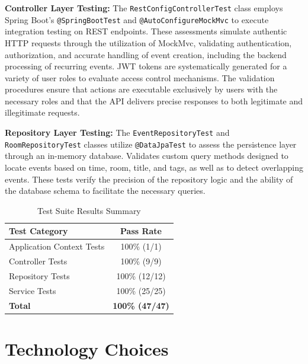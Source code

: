 \textbf{Controller Layer Testing:} The \texttt{RestConfigControllerTest} class employs Spring Boot's \texttt{@SpringBootTest} and \texttt{@AutoConfigureMockMvc} to execute integration testing on REST endpoints.
These assessments simulate authentic HTTP requests through the utilization of MockMvc, validating authentication, authorization, and accurate handling of event creation, including the backend processing of recurring events.
JWT tokens are systematically generated for a variety of user roles to evaluate access control mechanisms.
The validation procedures ensure that actions are executable exclusively by users with the necessary roles and that the API delivers precise responses to both legitimate and illegitimate requests.

\textbf{Repository Layer Testing:} The \texttt{EventRepositoryTest} and \texttt{RoomRepositoryTest} classes utilize \texttt{@DataJpaTest} to assess the persistence layer through an in-memory database.
Validates custom query methods designed to locate events based on time, room, title, and tags, as well as to detect overlapping events.
These tests verify the precision of the repository logic and the ability of the database schema to facilitate the necessary queries.

\begin{table}[htbp]
    \centering
    \caption{Test Suite Results Summary}
    \begin{tabular}{|p{}|c|}
        \hline
        \textbf{Test Category}    & \textbf{Pass Rate}     \\
        \hline
        Application Context Tests & 100\% (1/1)            \\
        \hline
        Controller Tests          & 100\% (9/9)            \\
        \hline
        Repository Tests          & 100\% (12/12)          \\
        \hline
        Service Tests             & 100\% (25/25)          \\
        \hline
        \textbf{Total}            & \textbf{100\% (47/47)} \\
        \hline
    \end{tabular}
    \label{tab:test-results}
\end{table}


\section{Technology Choices}\label{sec:technology-choices}

